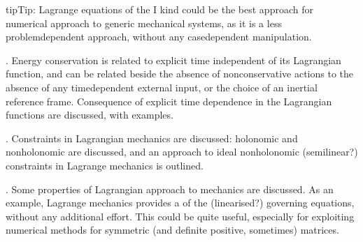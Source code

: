 \documentclass[letterpaper,10pt,english]{jupyterBook}
\begin{document}
\begin{sphinxadmonition}{tip}{Tip:}
\sphinxAtStartPar
Lagrange equations of the I kind could be the best approach for numerical approach to generic mechanical systems, as it is a less problem\sphinxhyphen{}dependent approach, without any case\sphinxhyphen{}dependent manipulation.
\end{sphinxadmonition}

\sphinxAtStartPar
{\hyperref[\detokenize{ch/lagrange-t-explicit:classical-mechanics-lagrange-time-dependent}]{}}. Energy conservation is related to explicit time independent of its Lagrangian function, and can be related \sphinxhyphen{} beside the absence of non\sphinxhyphen{}conservative actions \sphinxhyphen{} to the absence of any time\sphinxhyphen{}dependent external input, or the choice of an inertial reference frame. Consequence of explicit time dependence in the Lagrangian functions are discussed, with examples.

\sphinxAtStartPar
{\hyperref[\detokenize{ch/lagrange-constraints:classical-mechanics-lagrange-constraints}]{}}. Constraints in Lagrangian mechanics are discussed: holonomic and non\sphinxhyphen{}holonomic are discussed, and an approach to ideal non\sphinxhyphen{}holonomic (semi\sphinxhyphen{}linear?) constraints in Lagrange mechanics is outlined.

\sphinxAtStartPar
{\hyperref[\detokenize{ch/lagrange-properties:classical-mechanics-lagrange-properties}]{}}. Some properties of Lagrangian approach to mechanics are discussed. As an example, Lagrange mechanics provides a  of the (linearised?) governing equations, without any additional effort. This could be quite useful, especially for exploiting numerical methods for symmetric (and definite positive, sometimes) matrices.



\sphinxstepscope
\end{document}
